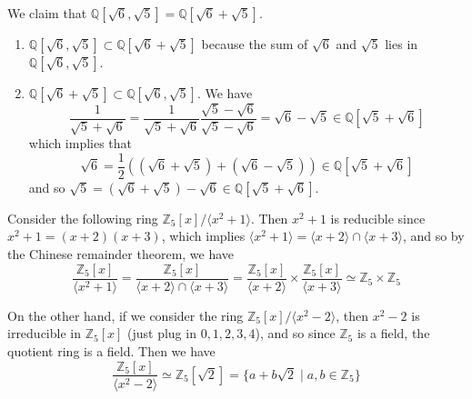   \begin{example}
    We claim that $\mathbb{Q}[\sqrt{6}, \sqrt{5}] = \mathbb{Q}[\sqrt{6} + \sqrt{5}]$. 
    \begin{enumerate}
      \item $\mathbb{Q}[\sqrt{6}, \sqrt{5}] \subset \mathbb{Q}[\sqrt{6} + \sqrt{5}]$ because the sum of $\sqrt{6}$ and $\sqrt{5}$ lies in $\mathbb{Q}[\sqrt{6}, \sqrt{5}]$. 
      \item $\mathbb{Q}[\sqrt{6} + \sqrt{5}] \subset \mathbb{Q}[\sqrt{6}, \sqrt{5}]$. We have 
        \begin{equation}
          \frac{1}{\sqrt{5} + \sqrt{6}} = \frac{1}{\sqrt{5} + \sqrt{6}} \frac{\sqrt{5} - \sqrt{6}}{\sqrt{5} - \sqrt{6}} = \sqrt{6} - \sqrt{5} \in \mathbb{Q}[\sqrt{5} + \sqrt{6}] 
        \end{equation}
        which implies that 
        \begin{equation}
          \sqrt{6} = \frac{1}{2} ((\sqrt{6} + \sqrt{5}) + (\sqrt{6} - \sqrt{5})) \in \mathbb{Q}[\sqrt{5} + \sqrt{6}] 
        \end{equation}
        and so $\sqrt{5} = (\sqrt{6} + \sqrt{5}) - \sqrt{6} \in \mathbb{Q}[\sqrt{5} + \sqrt{6}]$. 
    \end{enumerate}
  \end{example}

  \begin{example}
    Consider the following ring $\mathbb{Z}_5 [x] / \langle x^2 + 1 \rangle$. Then $x^2 + 1$ is reducible since $x^2 + 1 = (x + 2) (x + 3)$, which implies $\langle x^2 + 1 \rangle = \langle x + 2 \rangle \cap \langle x + 3 \rangle$, and so by the Chinese remainder theorem, we have 
    \begin{equation}
      \frac{\mathbb{Z}_5 [x]}{\langle x^2 + 1 \rangle} = \frac{\mathbb{Z}_5 [x]}{\langle x + 2 \rangle \cap \langle x + 3 \rangle} = \frac{\mathbb{Z}_5 [x]}{\langle x + 2 \rangle} \times \frac{\mathbb{Z}_5 [x]}{\langle x + 3 \rangle} \simeq \mathbb{Z}_5 \times \mathbb{Z}_5
    \end{equation}
  \end{example} 

  \begin{example}
    On the other hand, if we consider the ring $\mathbb{Z}_5 [x] / \langle x^2 - 2 \rangle$, then $x^2 - 2$ is irreducible in $\mathbb{Z}_5 [x]$ (just plug in $0, 1, 2, 3, 4$), and so since $\mathbb{Z}_5$ is a field, the quotient ring is a field. Then we have 
    \begin{equation}
      \frac{\mathbb{Z}_5 [x]}{\langle x^2 - 2 \rangle} \simeq \mathbb{Z}_5 [\sqrt{2}] = \{a + b \sqrt{2} \mid a, b \in \mathbb{Z}_5 \}
    \end{equation}
  \end{example} 

